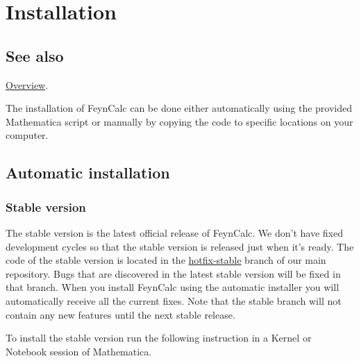 \documentclass[../FeynCalcManual.tex]{subfiles}
\begin{document}
\hypertarget{installation}{
\section{Installation}\label{installation}}

\subsection{See also}

\hyperlink{toc}{Overview}.

The installation of FeynCalc can be done either automatically using the
provided Mathematica script or manually by copying the code to specific
locations on your computer.

\hypertarget{automatic-installation}{%
\subsection{Automatic installation}\label{automatic-installation}}

\hypertarget{stable-version}{%
\subsubsection{Stable version}\label{stable-version}}

The stable version is the latest official release of FeynCalc. We don't
have fixed development cycles so that the stable version is released
just when it's ready. The code of the stable version is located in the
\href{https://github.com/FeynCalc/feyncalc/tree/hotfix-stable}{hotfix-stable}
branch of our main repository. Bugs that are discovered in the latest
stable version will be fixed in that branch. When you install FeynCalc
using the automatic installer you will automatically receive all the
current fixes. Note that the stable branch will not contain any new
features until the next stable release.

To install the stable version run the following instruction in a Kernel
or Notebook session of Mathematica.

\begin{Shaded}
\begin{Highlighting}[]
\OperatorTok{[}\OperatorTok{]}
\OperatorTok{[]}
\end{Highlighting}
\end{Shaded}
\end{document}
